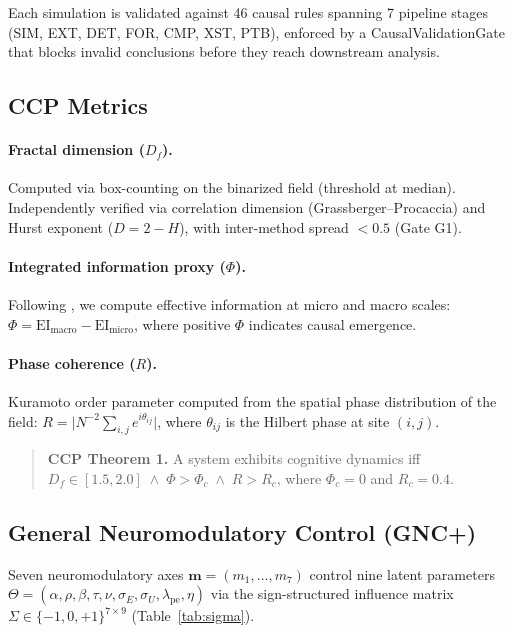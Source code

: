 \documentclass[10pt,letterpaper]{article}
\begin{document}
Each simulation is validated against 46 causal rules spanning 7
pipeline stages (SIM, EXT, DET, FOR, CMP, XST, PTB), enforced by
a CausalValidationGate that blocks invalid conclusions before they
reach downstream analysis.

\subsection{CCP Metrics}

\paragraph{Fractal dimension ($D_f$).}
Computed via box-counting on the binarized field (threshold at
median). Independently verified via correlation dimension
(Grassberger--Procaccia) and Hurst exponent ($D = 2 - H$),
with inter-method spread $< 0.5$ (Gate G1).

\paragraph{Integrated information proxy ($\Phi$).}
Following \citet{hoel2013}, we compute effective information at
micro and macro scales:
$\Phi = \text{EI}_{\text{macro}} - \text{EI}_{\text{micro}}$,
where positive $\Phi$ indicates causal emergence.

\paragraph{Phase coherence ($R$).}
Kuramoto order parameter \citep{kuramoto1984} computed from the
spatial phase distribution of the field:
$R = \bigl| N^{-2} \sum_{i,j} e^{i\theta_{ij}} \bigr|$,
where $\theta_{ij}$ is the Hilbert phase at site $(i,j)$.

\begin{quote}
  \textbf{CCP Theorem 1.} A system exhibits cognitive dynamics iff
  $D_f \in [1.5, 2.0] \;\land\; \Phi > \Phi_c \;\land\; R > R_c$,
  where $\Phi_c = 0$ and $R_c = 0.4$.
\end{quote}

\subsection{General Neuromodulatory Control (GNC+)}

Seven neuromodulatory axes $\mathbf{m} = (m_1, \ldots, m_7)$ control
nine latent parameters
$\Theta = (\alpha, \rho, \beta, \tau, \nu, \sigma_E, \sigma_U,
\lambda_{\text{pe}}, \eta)$ via the sign-structured influence matrix
$\Sigma \in \{-1, 0, +1\}^{7 \times 9}$ (Table~\ref{tab:sigma}).
\end{document}
